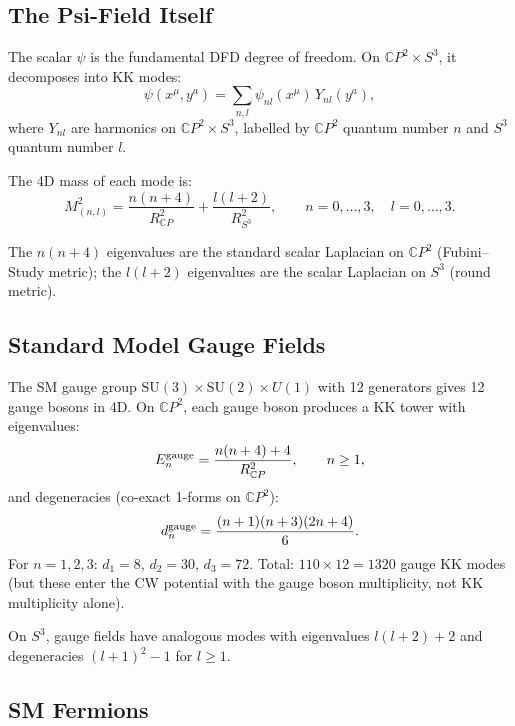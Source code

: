 \documentclass[11pt,a4paper]{article}
\newcommand{\CP}{\mathbb{C}P}
\begin{document}
\subsection{The Psi-Field Itself}

The scalar $\psi$ is the fundamental DFD degree of freedom. On
$\CP^2 \times S^3$, it decomposes into KK modes:
\begin{equation}
\psi(x^\mu, y^a) = \sum_{n,l} \psi_{nl}(x^\mu)\,Y_{nl}(y^a),
\end{equation}
where $Y_{nl}$ are harmonics on $\CP^2 \times S^3$, labelled by
$\CP^2$ quantum number $n$ and $S^3$ quantum number $l$.

The 4D mass of each mode is:
\begin{equation}
\boxed{
M^2_{(n,l)} = \frac{n(n+4)}{R_{\CP}^2} + \frac{l(l+2)}{R_{S^3}^2},
\qquad n = 0,\ldots,3, \quad l = 0,\ldots,3.
}
\label{eq:KK-mass}
\end{equation}

The $n(n+4)$ eigenvalues are the standard scalar Laplacian on $\CP^2$
(Fubini--Study metric); the $l(l+2)$ eigenvalues are the scalar
Laplacian on $S^3$ (round metric).

\subsection{Standard Model Gauge Fields}

The SM gauge group $\mathrm{SU}(3) \times \mathrm{SU}(2) \times
U(1)$ with 12 generators gives 12 gauge bosons in 4D. On $\CP^2$,
each gauge boson produces a KK tower with eigenvalues:
\begin{equation}
E_n^{\rm gauge} = \frac{n(n+4) + 4}{R_{\CP}^2}, \qquad n \geq 1,
\end{equation}
and degeneracies (co-exact 1-forms on $\CP^2$):
\begin{equation}
d_n^{\rm gauge} = \frac{(n+1)(n+3)(2n+4)}{6}.
\end{equation}
For $n = 1,2,3$: $d_1 = 8$, $d_2 = 30$, $d_3 = 72$. Total:
$110 \times 12 = 1320$ gauge KK modes (but these enter the CW
potential with the gauge boson multiplicity, not KK multiplicity
alone).

On $S^3$, gauge fields have analogous modes with eigenvalues
$l(l+2) + 2$ and degeneracies $(l+1)^2 - 1$ for $l \geq 1$.

\subsection{SM Fermions}
\end{document}
